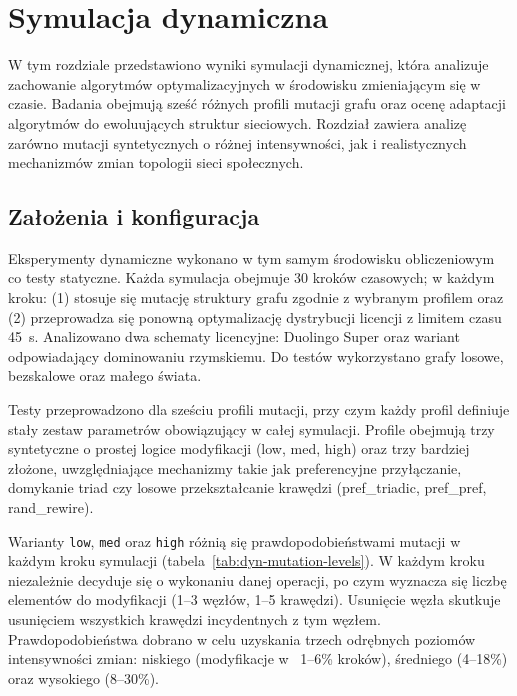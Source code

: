 \chapter{Symulacja dynamiczna}\label{chap:dynamic}

W tym rozdziale przedstawiono wyniki symulacji dynamicznej, która analizuje zachowanie algorytmów optymalizacyjnych w środowisku zmieniającym się w czasie. Badania obejmują sześć różnych profili mutacji grafu oraz ocenę adaptacji algorytmów do ewoluujących struktur sieciowych. Rozdział zawiera analizę zarówno mutacji syntetycznych o różnej intensywności, jak i realistycznych mechanizmów zmian topologii sieci społecznych.

\section{Założenia i konfiguracja}

Eksperymenty dynamiczne wykonano w tym samym środowisku obliczeniowym co testy statyczne. Każda symulacja obejmuje 30 kroków czasowych; w każdym kroku: (1) stosuje się mutację struktury grafu zgodnie z wybranym profilem oraz (2) przeprowadza się ponowną optymalizację dystrybucji licencji z limitem czasu \SI{45}{\second}. Analizowano dwa schematy licencyjne: Duolingo Super oraz wariant odpowiadający dominowaniu rzymskiemu. Do testów wykorzystano grafy losowe, bezskalowe oraz małego świata.

Testy przeprowadzono dla sześciu profili mutacji, przy czym każdy profil definiuje stały zestaw parametrów obowiązujący w całej symulacji. Profile obejmują trzy syntetyczne o prostej logice modyfikacji (low, med, high) oraz trzy bardziej złożone, uwzględniające mechanizmy takie jak preferencyjne przyłączanie, domykanie triad czy losowe przekształcanie krawędzi (pref\_triadic, pref\_pref, rand\_rewire).

Warianty \texttt{low}, \texttt{med} oraz \texttt{high} różnią się prawdopodobieństwami mutacji w każdym kroku symulacji (tabela~\ref{tab:dyn-mutation-levels}). W każdym kroku niezależnie decyduje się o wykonaniu danej operacji, po czym wyznacza się liczbę elementów do modyfikacji (1--3 węzłów, 1--5 krawędzi). Usunięcie węzła skutkuje usunięciem wszystkich krawędzi incydentnych z tym węzłem. Prawdopodobieństwa dobrano w celu uzyskania trzech odrębnych poziomów intensywności zmian: niskiego (modyfikacje w ~1--6\% kroków), średniego (4--18\%) oraz wysokiego (8--30\%).

